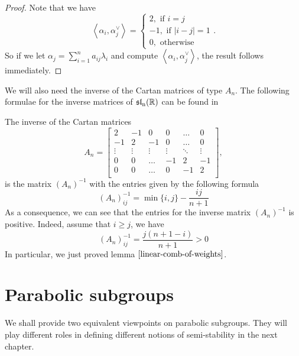 \begin{proof}
    Note that we have
    \[\left\langle \alpha_i,\alpha_j^{\vee}\right\rangle = \begin{cases}
            2, \mbox{ if } i =j     \\
            -1, \mbox{ if } |i-j|=1 \\
            0, \mbox{ otherwise }
        \end{cases}. \]
    So if we let $\alpha_j = \sum_{i=1}^n a_{ij}\lambda_i$ and compute $\left\langle \alpha_i,\alpha_j^{\vee}\right\rangle$, the result follows immediately.
\end{proof}
We will also need the inverse of the Cartan matrices of type $A_n$. The following formulae for the
inverse matrices of $\operatorname{\mathfrak{sl}_n(\mathbb{R})}$ can be found in \cite{}
\begin{theorem}
    The inverse of the Cartan matrices
    \[A_n = \begin{bmatrix}
            2      & -1     & 0      & 0      & \ldots & 0      \\
            -1     & 2      & -1     & 0      & \ldots & 0      \\
            \vdots & \vdots & \vdots & \vdots & \ddots & \vdots \\
            0      & 0      & \ldots & -1     & 2      & -1     \\
            0      & 0      & \ldots & 0      & -1     & 2      \\
        \end{bmatrix},\]
    is the matrix $(A_n)^{-1}$ with the entries given by the following formula
    \[(A_n)^{-1}_{ij} = \min\{i,j\}-\dfrac{ij}{n+1}\]
    As a consequence, we can see that the entries for the inverse matrix $(A_n)^{-1}$ is positive. Indeed, assume that
    $i \ge j$, we have
    \[(A_n)^{-1}_{ij} = \dfrac{j(n+1-i)}{n+1}>0\]
    In particular, we just proved lemma $\ref{linear-comb-of-weights}$.
\end{theorem}
\section{Parabolic subgroups}
We shall provide two equivalent viewpoints on parabolic subgroups. They will play different roles in defining
different notions of semi-stability in the next chapter.
